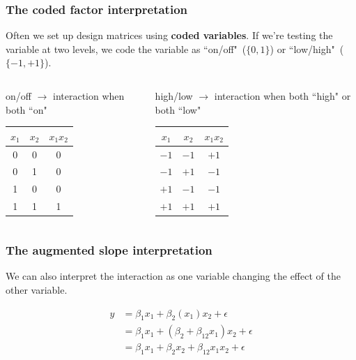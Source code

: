 \documentclass{beamer}
\begin{document}
\begin{frame}
\frametitle{The coded factor interpretation}

Often we set up design matrices using \textbf{coded variables}. If we're testing the variable at two levels, we code the variable as ``on/off"~($\{0,1\}$) or ``low/high"~($\{-1,+1\}$).

\pause
\bigskip
\begin{columns}
\begin{column}{0.55\textwidth}
on/off $\rightarrow$ interaction when both ``on"
\begin{center}
\begin{tabular}{cc|c}
	$x_1$ & $x_2$ & $x_1x_2$ \\
	\hline
	0 & 0 & 0 \\
	0 & 1 & 0 \\
	1 & 0 & 0 \\
	1 & 1 & 1
\end{tabular}
\end{center}
\end{column}

\pause
\begin{column}{0.5\textwidth}
high/low $\rightarrow$ interaction when both ``high" or both ``low"
\begin{center}
\begin{tabular}{cc|c}
	$x_1$ & $x_2$ & $x_1x_2$ \\
	\hline
	$-1$ & $-1$ & $+1$ \\
	$-1$ & $+1$ & $-1$ \\
	$+1$ & $-1$ & $-1$ \\
	$+1$ & $+1$ & $+1$
\end{tabular}
\end{center}
\end{column}
\end{columns}

\end{frame}

\begin{frame}
\frametitle{The augmented slope interpretation}

We can also interpret the interaction as one variable changing the effect of the other variable.

\begin{align*}
	y &= \beta_1x_1 + \beta_2(x_1)x_2 + \epsilon \\
	 &= \beta_1x_1 + (\beta_2 + \beta_{12}x_1)x_2 + \epsilon \\
	 &= \beta_1x_1 + \beta_2x_2 + \beta_{12}x_1x_2 + \epsilon
\end{align*}
\end{frame}
\end{document}
